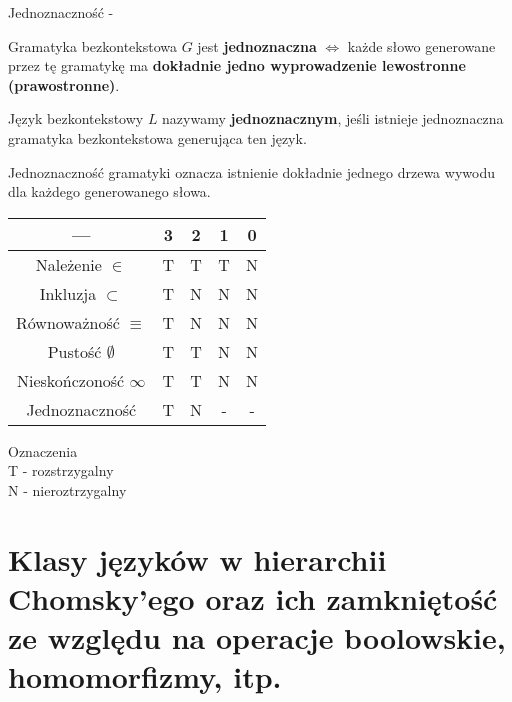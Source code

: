 \documentclass[main.tex]{subfiles}
\begin{document}
    \begin{definition}
        Jednoznaczność -

        Gramatyka bezkontekstowa $G$ jest \textbf{jednoznaczna} $\Leftrightarrow$ każde słowo generowane przez tę gramatykę ma \textbf{dokładnie jedno wyprowadzenie lewostronne (prawostronne)}.

        Język bezkontekstowy $L$ nazywamy \textbf{jednoznacznym}, jeśli istnieje jednoznaczna gramatyka bezkontekstowa generująca ten język.

        Jednoznaczność gramatyki oznacza istnienie dokładnie jednego drzewa wywodu dla każdego generowanego słowa.
    \end{definition}


    \begin{center}
        \begin{tabular}{||c c c c c||}
            \hline
            --- & 3 & 2 & 1 & 0 \\ [0.5ex]
            \hline\hline
            Należenie $\in$ & T & T & T & N \\
            \hline
            Inkluzja $\subset$ & T & N & N & N \\
            \hline
            Równoważność $\equiv$ & T & N & N & N \\
            \hline
            Pustość $\emptyset$ & T & T & N & N \\
            \hline
            Nieskończoność $\infty$ & T & T & N & N \\
            \hline
            Jednoznaczność & T & N & - & - \\ [1ex]
            \hline
        \end{tabular}
    \end{center}

    Oznaczenia\\
    T - rozstrzygalny\\
    N - nieroztrzygalny

    \newpage


    \section{Klasy języków w hierarchii Chomsky’ego oraz ich zamkniętość ze względu na operacje boolowskie, homomorfizmy, itp.}
\end{document}
